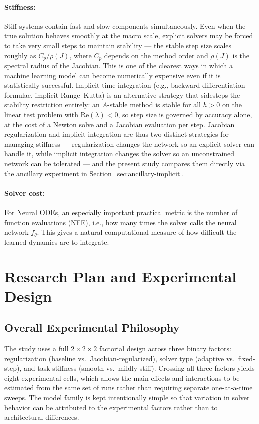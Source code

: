 \documentclass[11pt]{article}
\begin{document}
\paragraph{Stiffness:}
Stiff systems contain fast and slow components simultaneously. Even when the true solution behaves smoothly at the macro scale, explicit solvers may be forced to take very small steps to maintain stability --- the stable step size scales roughly as $C_p / \rho(J)$, where $C_p$ depends on the method order and $\rho(J)$ is the spectral radius of the Jacobian. This is one of the clearest ways in which a machine learning model can become numerically expensive even if it is statistically successful. Implicit time integration (e.g., backward differentiation formulae, implicit Runge--Kutta) is an alternative strategy that sidesteps the stability restriction entirely: an $A$-stable method is stable for all $h > 0$ on the linear test problem with $\text{Re}(\lambda) < 0$, so step size is governed by accuracy alone, at the cost of a Newton solve and a Jacobian evaluation per step. Jacobian regularization and implicit integration are thus two distinct strategies for managing stiffness --- regularization changes the network so an explicit solver can handle it, while implicit integration changes the solver so an unconstrained network can be tolerated --- and the present study compares them directly via the ancillary experiment in Section~\ref{sec:ancillary-implicit}.

\paragraph{Solver cost:}
For Neural ODEs, an especially important practical metric is the number of function evaluations (NFE), i.e., how many times the solver calls the neural network $f_{\theta}$. This gives a natural computational measure of how difficult the learned dynamics are to integrate.

\section{Research Plan and Experimental Design}

\subsection{Overall Experimental Philosophy}

The study uses a full $2 \times 2 \times 2$ factorial design across three binary factors: regularization (baseline vs.\ Jacobian-regularized), solver type (adaptive vs.\ fixed-step), and task stiffness (smooth vs.\ mildly stiff). Crossing all three factors yields eight experimental cells, which allows the main effects and interactions to be estimated from the same set of runs rather than requiring separate one-at-a-time sweeps. The model family is kept intentionally simple so that variation in solver behavior can be attributed to the experimental factors rather than to architectural differences.
\end{document}

